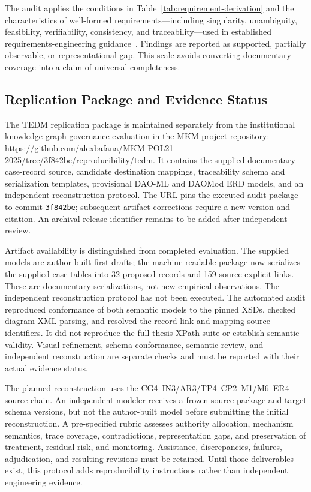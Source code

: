 \documentclass[referee,sn-basic]{sn-jnl}
\begin{document}
The audit applies the conditions in Table~\ref{tab:requirement-derivation} and
the characteristics of well-formed requirements---including singularity,
unambiguity, feasibility, verifiability, consistency, and traceability---used
in established requirements-engineering guidance~\cite{ISO29148}. Findings are
reported as supported, partially observable, or representational gap. This
scale avoids converting documentary coverage into a claim of universal
completeness.

\subsection{Replication Package and Evidence Status}
\label{subsec:replication-package}

The TEDM replication package is maintained separately from the institutional
knowledge-graph governance evaluation in the MKM project repository:
\url{https://github.com/alexbafana/MKM-POL21-2025/tree/3f842be/reproducibility/tedm}.
It contains the supplied documentary case-record source, candidate destination
mappings, traceability schema and serialization templates, provisional DAO-ML
and DAOMod ERD models, and an independent reconstruction protocol. The URL pins the executed audit package to commit \texttt{3f842be};
subsequent artifact corrections require a new version and citation. An archival
release identifier remains to be added after independent review.

Artifact availability is distinguished from completed evaluation. The supplied
models are author-built first drafts; the machine-readable package now serializes the supplied case tables into
32 proposed records and 159 source-explicit links. These are documentary
serializations, not new empirical observations. The independent reconstruction protocol
has not been executed. The automated audit reproduced conformance of both semantic models to the
pinned XSDs, checked diagram XML parsing, and resolved the record-link and
mapping-source identifiers. It did not reproduce the full thesis XPath suite
or establish semantic validity. Visual refinement,
schema conformance, semantic review, and independent reconstruction are separate
checks and must be reported with their actual evidence status.

The planned reconstruction uses the CG4--IN3/AR3/TP4--CP2--M1/M6--ER4 source
chain. An independent modeler receives a frozen source package and target
schema versions, but not the author-built model before submitting the initial
reconstruction. A pre-specified rubric assesses authority allocation, mechanism
semantics, trace coverage, contradictions, representation gaps, and preservation
of treatment, residual risk, and monitoring. Assistance, discrepancies,
failures, adjudication, and resulting revisions must be retained. Until those
deliverables exist, this protocol adds reproducibility instructions rather than
independent engineering evidence.
\end{document}
